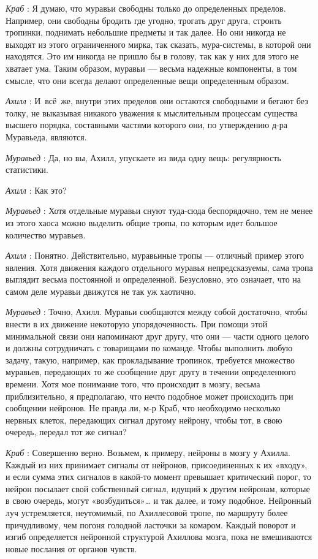 \documentclass[../main.tex]{subfiles}
\begin{document}
\begin{dialogue}
\emph{Краб} : Я думаю, что муравьи свободны только до определенных пределов. Например, они свободны бродить где угодно, трогать друг друга, строить тропинки, поднимать небольшие предметы и так далее. Но они никогда не выходят из этого ограниченного мирка, так сказать, мура-системы, в которой они находятся. Это им никогда не пришло бы в голову, так как у них для этого не хватает ума. Таким образом, муравьи --- весьма надежные компоненты, в том смысле, что они всегда делают определенные вещи определенным образом.

\emph{Ахилл} : И~всё~же, внутри этих пределов они остаются свободными и бегают без толку, не выказывая никакого уважения к мыслительным процессам существа высшего порядка, составными частями которого они, по утверждению д-ра Муравьеда, являются.

\emph{Муравьед} : Да, но вы, Ахилл, упускаете из вида одну вещь: регулярность статистики.

\emph{Ахилл} : Как это?

\emph{Муравьед} : Хотя отдельные муравьи снуют туда-сюда беспорядочно, тем не менее из этого хаоса можно выделить общие тропы, по которым идет большое количество муравьев.

\emph{Ахилл} : Понятно. Действительно, муравьиные тропы --- отличный пример этого явления. Хотя движения каждого отдельного муравья непредсказуемы, сама тропа выглядит весьма постоянной и определенной. Безусловно, это означает, что на самом деле муравьи движутся не так уж хаотично.

\emph{Муравьед} : Точно, Ахилл. Муравьи сообщаются между собой достаточно, чтобы внести в их движение некоторую упорядоченность. При помощи этой минимальной связи они напоминают друг другу, что они --- части одного целого и должны сотрудничать с товарищами по команде. Чтобы выполнить любую задачу, такую, например, как прокладывание тропинок, требуется множество муравьев, передающих то же сообщение друг другу в течении определенного времени. Хотя мое понимание того, что происходит в мозгу, весьма приблизительно, я предполагаю, что нечто подобное может происходить при сообщении нейронов. Не правда ли, м-р Краб, что необходимо несколько нервных клеток, передающих сигнал другому нейрону, чтобы тот, в свою очередь, передал тот же сигнал?

\emph{Краб} : Совершенно верно. Возьмем, к примеру, нейроны в мозгу у Ахилла. Каждый из них принимает сигналы от нейронов, присоединенных к их «входу», и если сумма этих сигналов в какой-то момент превышает критический порог, то нейрон посылает свой собственный сигнал, идущий к другим нейронам, которые в свою очередь, могут «возбудиться»\ldots{} и так далее, и тому подобное. Нейронный луч устремляется, неутомимый, по Ахиллесовой тропе, по маршруту более причудливому, чем погоня голодной ласточки за комаром. Каждый поворот и изгиб определяется нейронной структурой Ахиллова мозга, пока не вмешиваются новые послания от органов чувств.


\end{dialogue}
\end{document}
